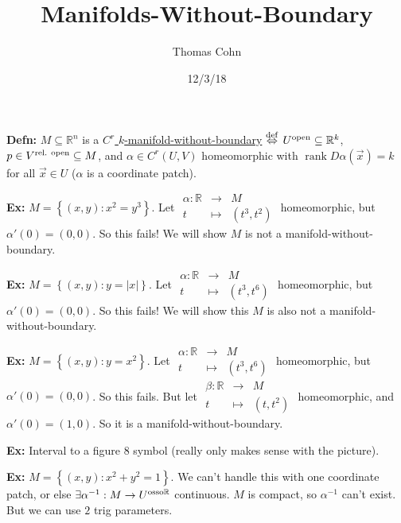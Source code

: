 \documentclass[10pt,letterpaper]{article}
\author{Thomas Cohn}
\title{Manifolds-Without-Boundary}
\date{12/3/18} %
\newcommand{\n}{\hfill\break}
\newcommand{\defn}[1]{\par\noindent\settowidth{\hangindent}{\textbf{Defn: }}\textbf{Defn: }#1\n}
\newcommand{\ex}[1]{\par\noindent\settowidth{\hangindent}{\textbf{Ex: }}\textbf{Ex: }#1\n}
\newcommand{\ptxt}[1]{\textrm{\textnormal{#1}}}
\newcommand{\set}[1]{\left\{#1\right\}}
\newcommand{\reals}{\mathbb{R}}
\newcommand{\R}{\reals}
\newcommand{\inv}{^{-1}}
\newcommand{\abs}[1]{\left|#1\right|}
\DeclareMathOperator{\rank}{rank}
\newcommand{\iffdef}{\overset{\ptxt{def}}{\Leftrightarrow}}
\begin{document}
\maketitle
\setlength\RaggedRightParindent{\parindent}
\RaggedRight

\defn{$M\subseteq\R^{n}$ is a \underline{$C^{r}$ $k$-manifold-without-boundary} $\iffdef$ $U^{\ptxt{open}}\subseteq\R^{k}$, $p\in{}V^{\ptxt{rel. open}}\subseteq{}M$, and\n
$\alpha\in{}C^{r}(U,V)$ homeomorphic with $\rank{}D\alpha(\vec{x})=k$ for all $\vec{x}\in{}U$ ($\alpha$ is a coordinate patch).}

\ex{$M=\set{(x,y):x^{2}=y^{3}}$. Let $\begin{array}{rcl}\alpha:\R & \to & M\\ t & \mapsto & (t^{3},t^{2})\end{array}$ homeomorphic, but $\alpha'(0)=(0,0)$. So this fails! We will show $M$ is not a manifold-without-boundary.}

\ex{$M=\set{(x,y):y=\abs{x}}$. Let $\begin{array}{rcl}\alpha:\R & \to & M\\ t & \mapsto & (t^{3},t^{6})\end{array}$ homeomorphic, but $\alpha'(0)=(0,0)$. So this fails! We will show this $M$ is also not a manifold-without-boundary.}

\ex{$M=\set{(x,y):y=x^{2}}$. Let $\begin{array}{rcl}\alpha:\R & \to & M\\ t & \mapsto & (t^{3},t^{6})\end{array}$ homeomorphic, but $\alpha'(0)=(0,0)$. So this fails.\n
But let $\begin{array}{rcl}\beta:\R & \to & M\\ t & \mapsto & (t,t^{2})\end{array}$ homeomorphic, and $\alpha'(0)=(1,0)$. So it is a manifold-without-boundary.}

\ex{Interval to a figure 8 symbol (really only makes sense with the picture).}

\ex{$M=\set{(x,y):x^{2}+y^{2}=1}$. We can't handle this with one coordinate patch, or else $\exists\alpha\inv:M\to{}U^{\ptxt{osso}\R}$ continuous. $M$ is compact, so $\alpha\inv$ can't exist. But we can use $2$ trig parameters.}
\end{document}
